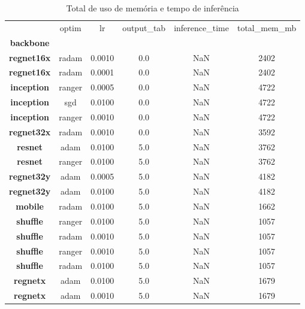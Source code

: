 \begin{table}
\centering
\caption{Total de uso de memória e tempo de inferência}
\label{tab:results_performance}
\begin{tabular}{c|c|c|c|c|c|}
\toprule
{} &   optim &      lr &  output\_tab &  inference\_time &  total\_mem\_mb \\
\textbf{backbone } &         &         &             &                 &               \\
\midrule
\textbf{regnet16x} &   radam &  0.0010 &         0.0 &             NaN &          2402 \\
\textbf{regnet16x} &   radam &  0.0001 &         0.0 &             NaN &          2402 \\
\textbf{inception} &  ranger &  0.0005 &         0.0 &             NaN &          4722 \\
\textbf{inception} &     sgd &  0.0100 &         0.0 &             NaN &          4722 \\
\textbf{inception} &  ranger &  0.0010 &         0.0 &             NaN &          4722 \\
\textbf{regnet32x} &   radam &  0.0010 &         0.0 &             NaN &          3592 \\
\textbf{resnet   } &    adam &  0.0100 &         5.0 &             NaN &          3762 \\
\textbf{resnet   } &  ranger &  0.0100 &         5.0 &             NaN &          3762 \\
\textbf{regnet32y} &    adam &  0.0005 &         5.0 &             NaN &          4182 \\
\textbf{regnet32y} &    adam &  0.0100 &         5.0 &             NaN &          4182 \\
\textbf{mobile   } &   radam &  0.0100 &         5.0 &             NaN &          1662 \\
\textbf{shuffle  } &  ranger &  0.0100 &         5.0 &             NaN &          1057 \\
\textbf{shuffle  } &   radam &  0.0010 &         5.0 &             NaN &          1057 \\
\textbf{shuffle  } &  ranger &  0.0010 &         5.0 &             NaN &          1057 \\
\textbf{shuffle  } &   radam &  0.0100 &         5.0 &             NaN &          1057 \\
\textbf{regnetx  } &    adam &  0.0100 &         5.0 &             NaN &          1679 \\
\textbf{regnetx  } &    adam &  0.0010 &         5.0 &             NaN &          1679 \\

\end{tabular}
\end{table}
